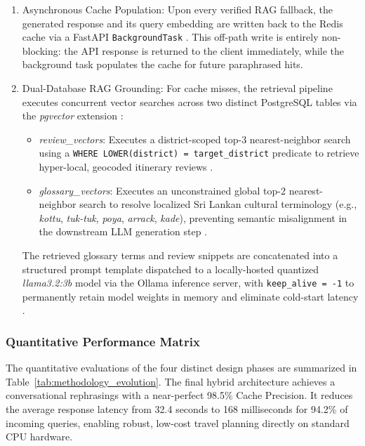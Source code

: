 \documentclass{ieeeaccess}
\begin{document}
\begin{enumerate}
    \item{Asynchronous Cache Population}: Upon every verified RAG fallback, the generated response and its query embedding are written back to the Redis cache via a FastAPI \texttt{BackgroundTask} \cite{devalla-microservice-rag-2025}. This off-path write is entirely non-blocking: the API response is returned to the client immediately, while the background task populates the cache for future paraphrased hits.

    \item{Dual-Database RAG Grounding}: For cache misses, the retrieval pipeline executes concurrent vector searches across two distinct PostgreSQL tables via the \emph{pgvector} extension \cite{lewis-rag-2020}:
    \begin{itemize}
        \item \emph{review\_vectors}: Executes a district-scoped top-3 nearest-neighbor search using a \texttt{WHERE LOWER(district) = target\_district} predicate to retrieve hyper-local, geocoded itinerary reviews \cite{ni-tprag-2025}.
        \item \emph{glossary\_vectors}: Executes an unconstrained global top-2 nearest-neighbor search to resolve localized Sri Lankan cultural terminology (e.g., \emph{kottu}, \emph{tuk-tuk}, \emph{poya}, \emph{arrack}, \emph{kade}), preventing semantic misalignment in the downstream LLM generation step \cite{tourllm-2024}.
    \end{itemize}
    The retrieved glossary terms and review snippets are concatenated into a structured prompt template dispatched to a locally-hosted quantized \emph{llama3.2:3b} model via the Ollama inference server, with \texttt{keep\_alive = -1} to permanently retain model weights in memory and eliminate cold-start latency \cite{dettmers-qlora-2024}.
\end{enumerate}

\subsubsection{Quantitative Performance Matrix}
The quantitative evaluations of the four distinct design phases are summarized in Table~\ref{tab:methodology_evolution}. The final hybrid architecture achieves a conversational rephrasings with a near-perfect 98.5\% Cache Precision. It reduces the average response latency from 32.4 seconds to 168 milliseconds for 94.2\% of incoming queries, enabling robust, low-cost travel planning directly on standard CPU hardware.
\end{document}
